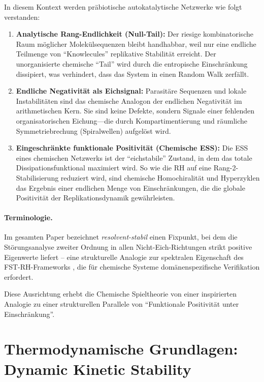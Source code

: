 \documentclass[12pt,a4paper]{article}
\theoremstyle{remark}
\begin{document}
In diesem Kontext werden pr\"abiotische autokatalytische Netzwerke wie folgt verstanden:
\begin{enumerate}[label=\alph*)]
    \item \textbf{Analytische Rang-Endlichkeit (Null-Tail):} Der riesige kombinatorische Raum m\"oglicher Molek\"ulsequenzen bleibt handhabbar, weil nur eine endliche Teilmenge von ``Knowlecules'' replikative Stabilit\"at erreicht. Der unorganisierte chemische ``Tail'' wird durch die entropische Einschr\"ankung dissipiert, was verhindert, dass das System in einen Random Walk zerf\"allt.
    \item \textbf{Endliche Negativit\"at als Eichsignal:} Parasit\"are Sequenzen und lokale Instabilit\"aten sind das chemische Analogon der endlichen Negativit\"at im arithmetischen Kern. Sie sind keine Defekte, sondern Signale einer fehlenden organisatorischen Eichung---die durch Kompartimentierung und r\"aumliche Symmetriebrechung (Spiralwellen) aufgel\"ost wird.
    \item \textbf{Eingeschr\"ankte funktionale Positivit\"at (Chemische ESS):} Die ESS eines chemischen Netzwerks ist der ``eichstabile'' Zustand, in dem das totale Dissipationsfunktional maximiert wird. So wie die RH auf eine Rang-2-Stabilisierung reduziert wird, sind chemische Homochiralit\"at und Hyperzyklen das Ergebnis einer endlichen Menge von Einschr\"ankungen, die die globale Positivit\"at der Replikationsdynamik gew\"ahrleisten.
\end{enumerate}

\paragraph{Terminologie.} Im gesamten Paper bezeichnet \emph{resolvent-stabil} einen Fixpunkt, bei dem die St\"orungsanalyse zweiter Ordnung in allen Nicht-Eich-Richtungen strikt positive Eigenwerte liefert -- eine strukturelle Analogie zur spektralen Eigenschaft des FST-RH-Frameworks \citep{GeigerRH2026b}, die f\"ur chemische Systeme dom\"anenspezifische Verifikation erfordert.

Diese Ausrichtung erhebt die Chemische Spieltheorie von einer inspirierten Analogie zu einer strukturellen Parallele von ``Funktionale Positivit\"at unter Einschr\"ankung''.

\section{Thermodynamische Grundlagen: Dynamic Kinetic Stability}
\label{sec:thermodynamics}
\end{document}
